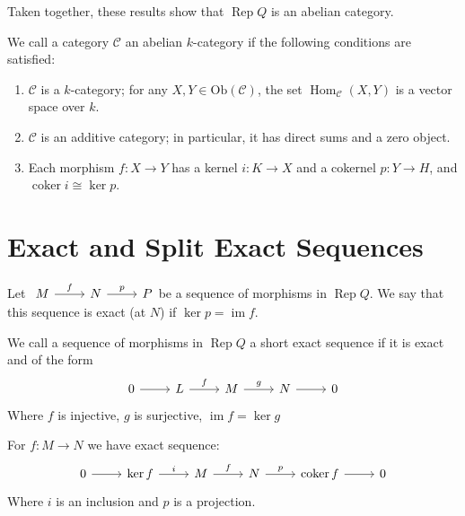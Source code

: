\documentclass[11pt, a4paper]{report}
\begin{document}
Taken together, these results show that $\operatorname{Rep}Q$ is an abelian category.

\begin{definition}
    We call a category $\mathcal{C}$ an abelian $k$-category if the following conditions are satisfied:
    \begin{enumerate}
        \item $\mathcal{C}$ is a $k$-category; for any $X,Y \in \mathrm{Ob}(\mathcal{C})$, the set $\operatorname{Hom}_{\mathcal{C}}(X,Y)$ is a vector space over $k$.
        \item $\mathcal{C}$ is an additive category; in particular, it has direct sums and a zero object.
        \item Each morphism $f: X \to Y$ has a kernel $i: K \to X$ and a cokernel $p: Y \to H$, and \(\operatorname{coker}i \cong \operatorname{ker}p\).
    \end{enumerate}
\end{definition}

\section{Exact and Split Exact Sequences}

\begin{definition}
    Let $ \begin{tikzcd}
            M \arrow[r, "f"] & N \arrow[r, "p"] & P
        \end{tikzcd} $be a sequence of morphisms in $ \operatorname{Rep}Q $. We say that this sequence is exact (at $ N $) if $ \operatorname{ker}p = \operatorname{im}f $.
\end{definition}

\begin{definition}
    We call a sequence of morphisms in $\operatorname{Rep}Q$ a short exact sequence if it is exact and of the form
    \[
        \begin{tikzcd}
            0 \arrow[r] & L \arrow[r, "f"] & M \arrow[r, "g"] & N \arrow[r] & 0
        \end{tikzcd}
    \]
    Where $f$ is injective, $g$ is surjective, $\operatorname{im}f = \operatorname{ker}g$
\end{definition}

For $f: M\to N$ we have exact sequence:
\[
    \begin{tikzcd}
        0 \arrow[r] & \operatorname{ker}f \arrow[r, "i"] & M \arrow[r, "f"] & N \arrow[r, "p"] & \operatorname{coker}f \arrow[r] & 0
    \end{tikzcd}
\]
Where $i$ is an inclusion and $p$ is a projection.
\end{document}
